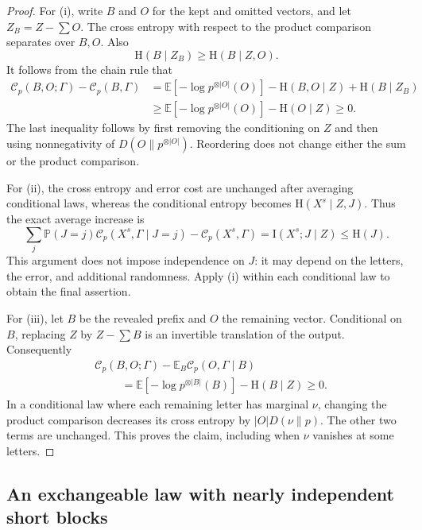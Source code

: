 \begin{proof}
For \textup{(i)}, write $B$ and $O$ for the kept and omitted vectors, and
let $Z_B=Z-\sum O$.  The cross entropy with respect to the product
comparison separates over $B,O$.  Also
\[
 \mathrm H(B\mid Z_B)\ge\mathrm H(B\mid Z,O).
\]
It follows from the chain rule that
\begin{align*}
 \mathcal C_p(B,O;\Gamma)-\mathcal C_p(B,\Gamma)
 &=\mathbb E[-\log p^{\otimes |O|}(O)]
   -\mathrm H(B,O\mid Z)+\mathrm H(B\mid Z_B)\\
 &\ge\mathbb E[-\log p^{\otimes |O|}(O)]-\mathrm H(O\mid Z)
 \ge0.
\end{align*}
The last inequality follows by first removing the conditioning on $Z$
and then using nonnegativity of $D(O\|p^{\otimes |O|})$.
Reordering does not change either the sum or the product comparison.

For \textup{(ii)}, the cross entropy and error cost are unchanged after
averaging conditional laws, whereas the conditional entropy becomes
$\mathrm H(X^s\mid Z,J)$.  Thus the exact average increase is
\begin{equation}
\label{entropy-foundations:index-cost}
 \sum_j\mathbb P(J=j)\mathcal C_p(X^s,\Gamma\mid J=j)
       -\mathcal C_p(X^s,\Gamma)
    =\mathrm I(X^s;J\mid Z)\le\mathrm H(J).
\end{equation}
This argument does not impose independence on $J$: it may depend on the
letters, the error, and additional randomness.  Apply \textup{(i)} within
each conditional law to obtain the final assertion.

For \textup{(iii)}, let $B$ be the revealed prefix and $O$ the remaining
vector.  Conditional on $B$, replacing $Z$ by $Z-\sum B$ is an invertible
translation of the output.  Consequently
\begin{align*}
 &\mathcal C_p(B,O;\Gamma)
    -\mathbb E_B\mathcal C_p(O,\Gamma\mid B)\\
 &\hspace{1cm}
   =\mathbb E[-\log p^{\otimes |B|}(B)]-\mathrm H(B\mid Z)
   \ge0.
\end{align*}
In a conditional law where each remaining letter has marginal $\nu$,
changing the product comparison decreases its cross entropy by
$|O|D(\nu\|p)$.  The other two terms are unchanged.  This proves the
claim, including when $\nu$ vanishes at some letters.
\end{proof}

\subsection{An exchangeable law with nearly independent short blocks}

